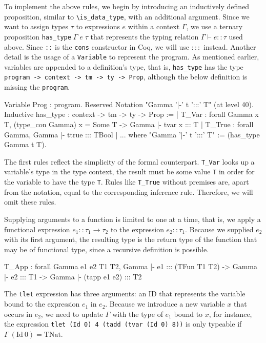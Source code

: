 \documentclass[paper = a4, fleqn, abstract=on, twoside]{scrreprt}
\newcommand{\coqinline}[1]{\texttt{#1}}
\begin{document}
\par
To implement the above rules, we begin by introducing an inductively defined proposition, similar to \texttt{\textbackslash is\_data\_type}, with an additional argument. Since we want to assign types $\tau$ to expressions $e$ within a context $\Gamma$, we use a ternary proposition \coqinline{has_type}$\; \Gamma \; e \; \tau$ that represents the typing relation $\Gamma \vdash e :: \tau$ used above. Since \coqinline{::} is the \coqinline{cons} constructor in Coq, we will use $:::$ instead. Another detail is the usage of a \coqinline{Variable} to represent the program. As mentioned earlier, variables are appended to a definition's type, that is, \coqinline{has_type} has the type \coqinline{program -> context -> tm -> ty -> Prop}, although the below definition is missing the \coqinline{program}.
\begin{coqcode}
Variable Prog : program.
Reserved Notation "Gamma '|-' t ':::' T" (at level 40).
Inductive has_type : context -> tm -> ty -> Prop :=
  | T_Var  : forall Gamma x T, (type_con Gamma) x = Some T ->
              Gamma |- tvar x ::: T
  | T_True : forall Gamma, Gamma |- ttrue ::: TBool
  | ...
where "Gamma '|-' t ':::' T" := (has_type Gamma t T).
\end{coqcode}
The first rules reflect the simplicity of the formal counterpart. \texttt{T\_Var} looks up a variable's type in the type context, the result must be some value \texttt{T} in order for the variable to have the type \texttt{T}. Rules like \texttt{T\_True} without premises are, apart from the notation, equal to the corresponding inference rule. Therefore, we will omit these rules.
\par
Supplying arguments to a function is limited to one at a time, that is, we apply a functional expression $e_{1} :: \tau_{1} \rightarrow \tau_{2}$ to the expression $e_{2} :: \tau_{1}$. Because we supplied $e_{2}$ with its first argument, the resulting type is the return type of the function that may be of functional type, since a recursive definition is possible.
\begin{coqcode}
T_App : forall Gamma e1 e2 T1 T2,
          Gamma |- e1 ::: (TFun T1 T2) -> Gamma |- e2 ::: T1 ->
          Gamma |- (tapp e1 e2) ::: T2
\end{coqcode}
The \coqinline{tlet} expression has three arguments: an ID that represents the variable bound to the expression $e_{1}$ in $e_{2}$. Because we introduce a new variable $x$ that occurs in $e_{2}$, we need to update $\Gamma$ with the type of $e_{1}$ bound to $x$, for instance, the expression \coqinline{tlet (Id 0) 4 (tadd (tvar (Id 0) 8))} is only typeable if $\Gamma \:(\text{Id}\: 0) = \text{TNat}$.
\end{document}
